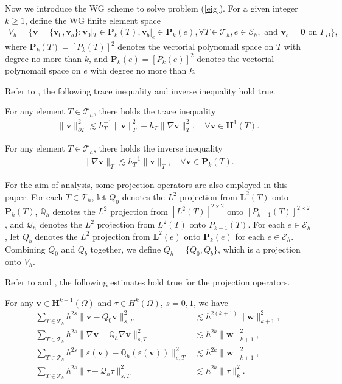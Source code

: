 \documentclass[leqno,CJK]{siamltex704}
\numberwithin{equation}{section}
\def\E{{\mathcal{E}}}
\def\T{{\mathcal{T}}}
\def\Q{{\mathcal{Q}}}
\def\dQ{{\mathbb{Q}}}
\def\b0{\boldsymbol{0}}
\def\sumT{\sum_{T\in\mathcal{T}_h}}     %
\def\bw{{\mathbf{w}}}
\def\bv{{\mathbf{v}}}
\def\bl{{\mathbf{L}}}
\def\bh{{\mathbf{H}}}
\def\bP{{\mathbf{P}}}
\newcommand{\eps}{\varepsilon}
\begin{document}
Now we introduce the WG scheme to solve problem (\ref{eig}).
For a given integer $k\ge 1$, define the WG finite element space
\begin{eqnarray*}
	V_h=\big\{\bv=\{\bv_0,\bv_b\}:\bv_0|_T\in \bP_k(T), \bv_b|_e\in \bP_k(e), \forall T\in\T_h, e\in\E_h,\text{ and } \bv_b=\b0 \text{ on }\Gamma_D\big\},
\end{eqnarray*}
where $\bP_k(T)=[P_k(T)]^2$ denotes the vectorial polynomail space on $T$ with degree no more than $k$, and
$\bP_k(e)=[P_k(e)]^2$ denotes the vectorial polynomail space on $e$ with degree no more than $k$.

Refer to \cite{Wang2013a}, the following trace inequality and inverse inequality hold true.
\begin{lemma}
	For any element  $T\in\T_h$, there holds the trace inequality
	\begin{eqnarray*}
		\|\bv\|_{\partial T}^2\lesssim h_T^{-1}\|\bv\|_T^2+h_T\|\nabla\bv\|_T^2,\quad\forall\bv\in\bh^1(T).
	\end{eqnarray*}
\end{lemma}
\begin{lemma}
	For any element $T\in\T_h$, there holds the inverse inequality
	\begin{eqnarray*}
		\|\nabla\bv\|_T\lesssim h_T^{-1}\|\bv\|_T,\quad\forall\bv\in\bP_k(T).
	\end{eqnarray*}
\end{lemma}

For the aim of analysis, some projection operators are also employed in this paper. For each $T\in\T_h$, let $Q_0$
denotes the $L^2$ projection from $\bl^2(T)$ onto $\bP_k(T)$, 
$\dQ_h$
denotes the $L^2$ projection from $[L^2(T)]^{2\times2}$ onto $[P_{k-1}(T)]^{2\times 2}$,
and $\Q_h$ denotes the $L^2$ projection from $L^2(T)$ onto $P_{k-1}(T)$.
For each $e\in\E_h$, let $Q_b$ denotes the $L^2$ projection from $\bl^2(e)$ onto $\bP_k(e)$ for each $e\in\E_h$.
Combining $Q_0$ and $Q_b$ together, we define $Q_h=\{Q_0,Q_b\}$,
which is a projection onto $V_h$.

Refer to \cite{Mu2013c} and \cite{Wang2015a}, the following estimates hold true for the projection operators.
\begin{lemma}\label{projection}
	For any $\bv\in\bh^{k+1}(\Omega)$ and $\tau\in H^k(\Omega)$, $s=0,1$, we have
	\begin{align*}
		\sumT h^{2s}\|\bv-Q_0\bv\|_{s,T}^2&\lesssim h^{2(k+1)}\|\bw\|_{k+1}^2,\\
		\sumT h^{2s}\|\nabla\bv-\dQ_h\nabla\bv\|_{s,T}^2&\lesssim  h^{2k}\|\bw\|_{k+1}^2,\\
		\sumT h^{2s}\|\eps(\bv)-\dQ_h(\eps(\bv))\|_{s,T}^2&\lesssim  h^{2k}\|\bw\|_{k+1}^2,\\
		\sumT h^{2s}\|\tau-\Q_h\tau\|_{s,T}^2&\lesssim h^{2k}\|\tau\|_k^2.
	\end{align*}
\end{lemma}
\end{document}
